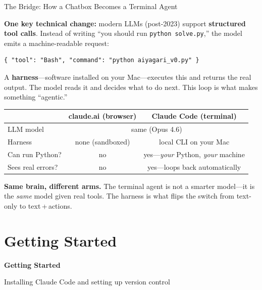 \documentclass[10pt,english,aspectratio=169]{beamer}
\newcommand{\sectiondivider}[2]{%
\begin{frame}[plain,noframenumbering]
\begin{center}
\vfill
{\Large\textbf{#1}\par}
\vspace{0.35cm}
{\normalsize #2\par}
\vfill
\end{center}
\end{frame}
}
\begin{document}
\begin{frame}[fragile]{The Bridge: How a Chatbox Becomes a Terminal Agent}

\textbf{One key technical change:} modern LLMs (post-2023) support \textbf{structured tool calls}.
Instead of writing ``you should run \texttt{python solve.py},'' the model emits a machine-readable request:

\begin{lstlisting}[style=pythonstyle,language={},basicstyle=\ttfamily\scriptsize,numbers=none]
{ "tool": "Bash", "command": "python aiyagari_v0.py" }
\end{lstlisting}

A \textbf{harness}---software installed on your Mac---executes this and returns the real output. The model reads it and decides what to do next. This loop is what makes something ``agentic.''

\vspace{0.2cm}

\begin{center}
\small
\begin{tabular}{|l|c|c|}
\hline
& \textbf{claude.ai (browser)} & \textbf{Claude Code (terminal)} \\ \hline
LLM model & \multicolumn{2}{c|}{same (Opus 4.6)} \\ \hline
Harness & none (sandboxed) & local CLI on your Mac \\ \hline
Can run Python? & no & yes---\textit{your} Python, \textit{your} machine \\ \hline
Sees real errors? & no & yes---loops back automatically \\ \hline
\end{tabular}
\end{center}

\vspace{0.2cm}

\textbf{Same brain, different arms.} The terminal agent is not a smarter model---it is the \textit{same} model given real tools. The harness is what flips the switch from text-only to text\,+\,actions.
\end{frame}

\section{Getting Started}

\sectiondivider{Getting Started}{Installing Claude Code and setting up version control}
\end{document}
